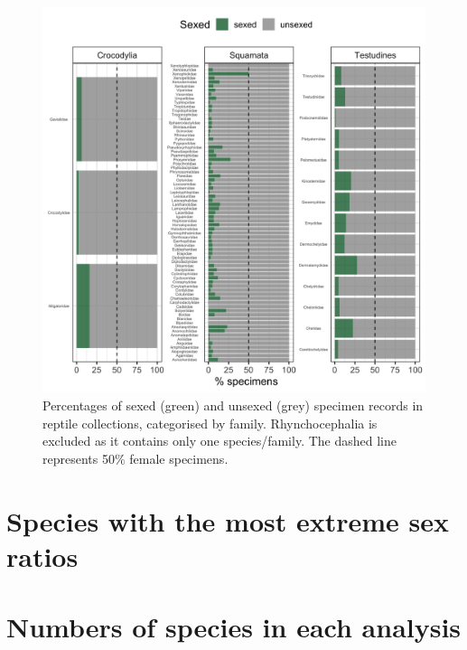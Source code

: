\documentclass[a4paper, 12pt]{article}
\begin{document}
\begin{figure}[H]
 \centering
  \includegraphics[width = \linewidth]{figures/all-unsexed-family-reptiles.png}
  \caption{Percentages of sexed (green) and unsexed (grey) specimen records in reptile collections, categorised by family. Rhynchocephalia is excluded as it contains only one species/family. 
  The dashed line represents 50\% female specimens.}
  \label{fig-reptile-family-unsexed}
\end{figure}



\newpage
\section{Species with the most extreme sex ratios}




\newpage
\section{Numbers of species in each analysis}
\end{document}
